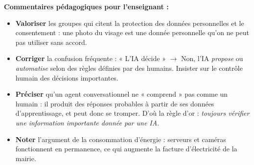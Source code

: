 \documentclass[11pt]{article}
\newcommand{\cle}[1]{{\popxbold\color{popdark}#1}}
\begin{document}
\begin{exoresolu}
\textbf{Commentaires pédagogiques pour l'enseignant :}
\begin{itemize}
    \item \textbf{Valoriser} les groupes qui citent la protection des \cle{données personnelles} et le \cle{consentement} : une photo du visage est une donnée personnelle qu'on ne peut pas utiliser sans accord.
    \item \textbf{Corriger} la confusion fréquente : « L'IA décide » $\rightarrow$ Non, l'IA \emph{propose} ou \emph{automatise} selon des règles définies par des humains. Insister sur le \cle{contrôle humain} des décisions importantes.
    \item \textbf{Préciser} qu'un agent conversationnel ne « comprend » pas comme un humain : il produit des réponses probables à partir de ses données d'apprentissage, et peut donc se tromper. D'où la règle d'or : \emph{toujours vérifier une information importante donnée par une IA}.
    \item \textbf{Noter} l'argument de la consommation d'énergie : serveurs et caméras fonctionnent en permanence, ce qui augmente la facture d'électricité de la mairie.
\end{itemize}
\end{exoresolu}
\end{document}

